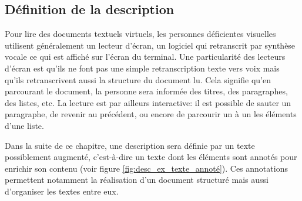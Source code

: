 \subsection{Définition de la description}

Pour lire des documents textuels virtuels, les personnes déficientes visuelles utilisent généralement un lecteur d’écran, un logiciel qui retranscrit par synthèse vocale ce qui est affiché sur l’écran du terminal. Une particularité des lecteurs d’écran est qu’ils ne font pas une simple retranscription texte vers voix mais qu’ils retranscrivent aussi la structure du document lu. Cela signifie qu’en parcourant le document, la personne sera informée des titres, des paragraphes, des listes, etc. La lecture est par ailleurs interactive: il est possible de sauter un paragraphe, de revenir au précédent, ou encore de parcourir un à un les éléments d’une liste.

\newpar{}

Dans la suite de ce chapitre, une description sera définie par un texte possiblement augmenté, c’est-à-dire un texte dont les éléments sont annotés pour enrichir son contenu \citep{oren2006semantic} (voir figure \ref{fig:desc_ex_texte_annoté}). Ces annotations permettent notamment la réalisation d’un document structuré mais aussi d’organiser les textes entre eux.


